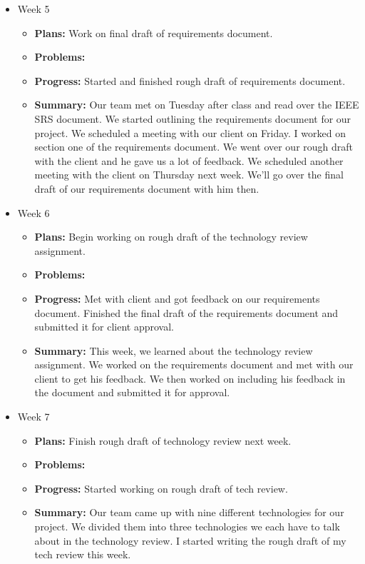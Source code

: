 \documentclass[onecolumn, draftclsnofoot,10pt, compsoc]{IEEEtran}
\begin{document}
\begin{itemize}
\begin{itemize}
	\end{itemize}
\item Week 5
	\begin{itemize}
	\item \textbf{Plans:} Work on final draft of requirements document.
    \item \textbf{Problems:} 
    \item \textbf{Progress:} Started and finished rough draft of requirements document.
    \item \textbf{Summary:} Our team met on Tuesday after class and read over the IEEE SRS document. We started outlining the requirements document for our project. We scheduled a meeting with our client on Friday. I worked on section one of the requirements document. We went over our rough draft with the client and he gave us a lot of feedback. We scheduled another meeting with the client on Thursday next week. We'll go over the final draft of our requirements document with him then.
	\end{itemize}
\item Week 6
	\begin{itemize}
	\item \textbf{Plans:} Begin working on rough draft of the technology review assignment.
    \item \textbf{Problems:} 
    \item \textbf{Progress:} Met with client and got feedback on our requirements document. Finished the final draft of the requirements document and submitted it for client approval.
    \item \textbf{Summary:} This week, we learned about the technology review assignment. We worked on the requirements document and met with our client to get his feedback. We then worked on including his feedback in the document and submitted it for approval.
	\end{itemize}
\item Week 7
	\begin{itemize}
	\item \textbf{Plans:} Finish rough draft of technology review next week.
    \item \textbf{Problems:} 
    \item \textbf{Progress:} Started working on rough draft of tech review.
    \item \textbf{Summary:} Our team came up with nine different technologies for our project. We divided them into three technologies we each have to talk about in the technology review. I started writing the rough draft of my tech review this week.

\end{itemize}
\end{itemize}
\end{document}
